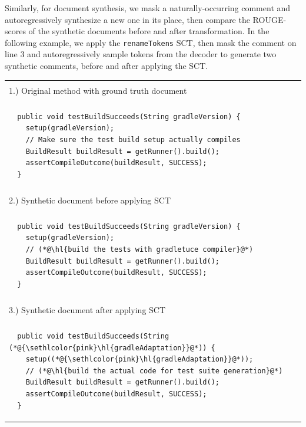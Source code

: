 \documentclass[usenames,dvipsnames]{article} %
\DeclareRobustCommand{\hlred}[1]{{\sethlcolor{pink}\hl{#1}}}
\begin{document}

  Similarly, for document synthesis, we mask a naturally-occurring comment and autoregressively synthesize a new one in its place, then compare the ROUGE-scores of the synthetic documents before and after transformation. In the following example, we apply the \lstinline|renameTokens| SCT, then mask the comment on line 3 and autoregressively sample tokens from the decoder to generate two synthetic comments, before and after applying the SCT.

  \begin{center}
    \begin{tabular}{|p{7.5cm}|}
      \hline\\[-1em]1.) Original method with ground truth document \\[-1em]\\\hline
      \begin{lstlisting}
  public void testBuildSucceeds(String gradleVersion) {
    setup(gradleVersion);
    // Make sure the test build setup actually compiles
    BuildResult buildResult = getRunner().build();
    assertCompileOutcome(buildResult, SUCCESS);
  }
      \end{lstlisting}
      \\\hline\\[-1em]2.) Synthetic document before applying SCT \\[-1em]\\\hline
      \begin{lstlisting}
  public void testBuildSucceeds(String gradleVersion) {
    setup(gradleVersion);
    // (*@\hl{build the tests with gradletuce compiler}@*)
    BuildResult buildResult = getRunner().build();
    assertCompileOutcome(buildResult, SUCCESS);
  }
      \end{lstlisting}
      \\\hline\\[-1em]3.) Synthetic document after applying SCT \\[-1em]\\\hline
      \begin{lstlisting}
  public void testBuildSucceeds(String (*@\hlred{gradleAdaptation}@*)) {
    setup((*@\hlred{gradleAdaptation}@*));
    // (*@\hl{build the actual code for test suite generation}@*)
    BuildResult buildResult = getRunner().build();
    assertCompileOutcome(buildResult, SUCCESS);
  }
      \end{lstlisting}\\\hline
    \end{tabular}
  \end{center}
\end{document}
